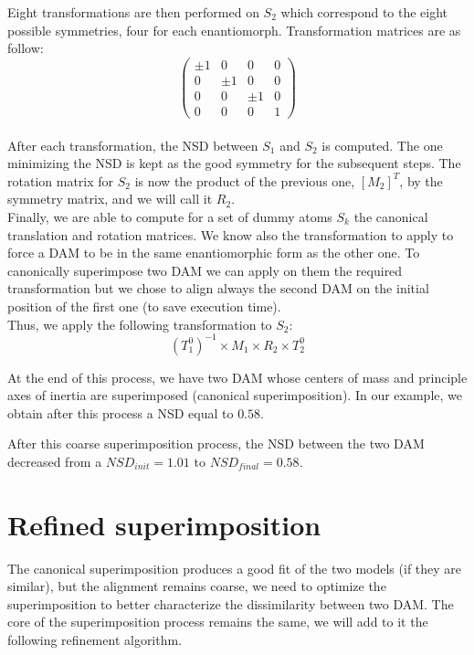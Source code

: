\documentclass[a4paper, 11pt]{report}
\begin{document}
Eight transformations are then performed on $S_{2}$ which correspond 
to the eight possible symmetries, four for each enantiomorph. 
Transformation matrices are as follow:
\[
\begin{pmatrix}
 \pm 1 & 0 & 0 & 0 \\
 0 & \pm 1 & 0 & 0 \\
 0 & 0 & \pm 1 & 0 \\
 0 & 0 & 0 & 1
\end{pmatrix}
\]\\
After each transformation, the NSD between $S_{1}$ and $S_{2}$ is 
computed. 
The one minimizing the NSD is kept as the good symmetry for the 
subsequent steps. 
The rotation matrix for $S_{2}$ is now the product of the previous 
one, $[M_{2}]^T$, by the symmetry matrix, and we will call it 
$R_{2}$.\\

Finally, we are able to compute for a set of dummy atoms $S_{k}$ the 
canonical translation and rotation matrices. 
We know also the transformation to apply to force a DAM to be in the 
same enantiomorphic form as the other one. 
To canonically superimpose two DAM we can apply on them the required 
transformation but we chose to align always the second DAM on the 
initial position of the first one (to save execution time).\\
Thus, we apply the following transformation to $S_{2}$:
\[(T_{1}^0)^{-1} \times M_{1} \times R_{2} \times T_{2}^0\]

At the end of this process, we have two DAM whose centers of mass and 
principle axes of inertia are superimposed (canonical superimposition). 
In our example, we obtain after this process a NSD equal to $0.58$.

After this coarse superimposition process, the NSD between the two DAM 
decreased from a $NSD_{init} = 1.01$ to $NSD_{final} = 0.58$. 

\section{Refined superimposition}

The canonical superimposition produces a good fit of the two models 
(if they are similar), but the alignment remains coarse, we need to 
optimize the superimposition to better characterize the dissimilarity 
between two DAM. 
The core of the superimposition process remains the same, we will add 
to it the following refinement algorithm.\\
 
\end{document}
